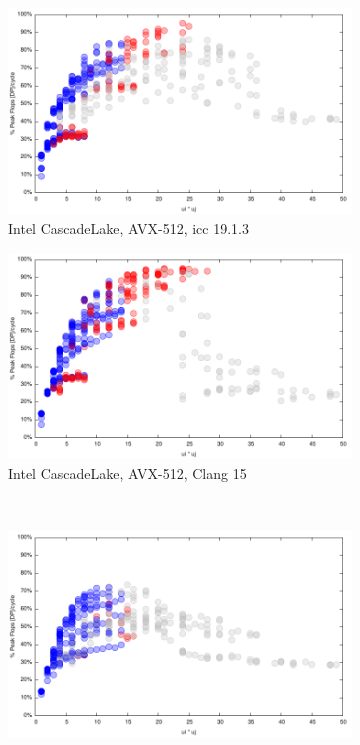 \documentclass{article}
\begin{document}
\begin{figure}[h!]
  \begin{subfigure}{0.45\textwidth}  
\includegraphics[width=\textwidth]{../benches/gemm/cascadelake-64x256x64/icc-19.1.3p.pdf}
  \caption{Intel CascadeLake, AVX-512, icc 19.1.3}
  \end{subfigure}
  \begin{subfigure}{0.45\textwidth}  
\includegraphics[width=\textwidth]{../benches/gemm/cascadelake-64x256x64/greedyp.pdf}
  \caption{Intel CascadeLake, AVX-512, Clang 15}
  \end{subfigure}\\
  \begin{subfigure}[h!]{0.45\textwidth}  
\includegraphics[width=\textwidth]{../benches/gemm/cascadelake-64x256x64/gcc-11.9p.pdf}

\end{subfigure}
\end{figure}
\end{document}
